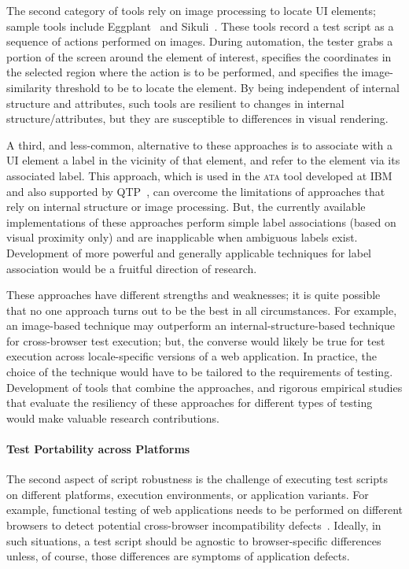 The second category of tools rely on image processing to locate UI elements;
sample tools include Eggplant~\cite{Eggplant} and Sikuli~\cite{Chang:2010,
  Yeh:2009}. These tools record a test script as a sequence of actions performed
on images. During automation, the tester grabs a portion of the screen around
the element of interest, specifies the coordinates in the selected region where
the action is to be performed, and specifies the image-similarity threshold to
be to locate the element. By being independent of internal structure and
attributes, such tools are resilient to changes in internal
structure/attributes, but they are susceptible to differences in visual
rendering.

A third, and less-common, alternative to these approaches is to associate with a
UI element a label in the vicinity of that element, and refer to the element via
its associated label. This approach, which is used in the \textsc{ata} tool
developed at IBM~\cite{thummalapenta:2012b, thummalapenta:2012a,
  thummalapenta:2013a} and also supported by QTP~\cite{hpqtp}, can overcome the
limitations of approaches that rely on internal structure or image
processing. But, the currently available implementations of these approaches
perform simple label associations (based on visual proximity only) and are
inapplicable when ambiguous labels exist. Development of more powerful and
generally applicable techniques for label association would be a fruitful
direction of research.

These approaches have different strengths and weaknesses; it is quite possible
that no one approach turns out to be the best in all circumstances. For example,
an image-based technique may outperform an internal-structure-based technique
for cross-browser test execution; but, the converse would likely be true for
test execution across locale-specific versions of a web application. In
practice, the choice of the technique would have to be tailored to the
requirements of testing.  Development of tools that combine the approaches, and
rigorous empirical studies that evaluate the resiliency of these approaches for
different types of testing would make valuable research contributions.

\vskip -5pt
\paragraph*{Test Portability across Platforms} The second aspect of script
robustness is the challenge of executing test scripts on different platforms,
execution environments, or application variants.  For example, functional
testing of web applications needs to be performed on different browsers to
detect potential cross-browser incompatibility
defects~\cite{Choudhary2010,Shauvik:2012,Choudhary:2013,Mesbah:2011}. Ideally,
in such situations, a test script should be agnostic to browser-specific
differences unless, of course, those differences are symptoms of application
defects.

